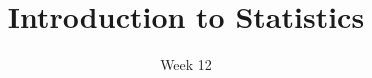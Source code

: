 \title{Introduction to Statistics}
\date{Week 12}





\thispagestyle{plain}
\graphicspath{{lectures/week11/}}




